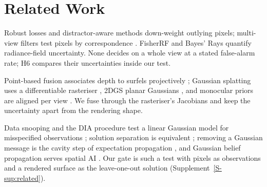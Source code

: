 \section{Related Work}
\label{sec:related}
 Robust losses \cite{rob_blackrangarajan,rob_barron} and
distractor-aware methods \cite{gs_robustnerf,gs_spotless,gs_robustsplat} down-weight outlying pixels;
multi-view filters test pixels by correspondence \cite{fus_merrell,fus_colmap_mvs}. FisherRF
\cite{unc_fisherrf} and Bayes' Rays \cite{unc_bayesrays} quantify radiance-field uncertainty. None decides
on a whole view at a stated false-alarm rate; H6 compares their uncertainties inside our test.

 Point-based fusion associates depth to surfels projectively
\cite{fus_keller_surfels}; Gaussian splatting uses a differentiable rasteriser \cite{gs_3dgs,gs_gsplat},
2DGS planar Gaussians \cite{gs_2dgs}, and monocular priors are aligned per view \cite{gs_dnsplatter,rec_monosdf}.
We fuse through the rasteriser's Jacobians and keep the uncertainty apart from the rendering shape.

 Data snooping and the DIA procedure test a linear Gaussian model for
misspecified observations \cite{stat_teunissen_dia}; solution separation is equivalent
\cite{flt_raim_joerger}; removing a Gaussian message is the cavity step of expectation propagation
\cite{mp_minka_ep}, and Gaussian belief propagation serves spatial AI \cite{mp_davison_gbp}. Our gate is
such a test with pixels as observations and a rendered surface as the leave-one-out solution
(Supplement~\ref{S-sup:related}).
